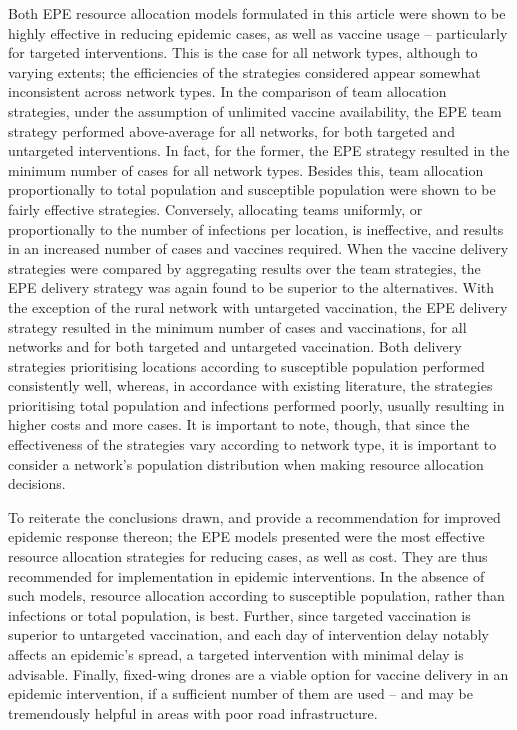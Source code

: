 \documentclass[10pt,letterpaper]{article}
\begin{document}
Both EPE resource allocation models formulated in this article were shown to be highly effective in reducing epidemic cases, as well as vaccine usage -- particularly for targeted interventions. This is the case for all network types, although to varying extents; the efficiencies of the strategies considered appear somewhat inconsistent across network types.
In the comparison of team allocation strategies, under the assumption of unlimited vaccine availability, the EPE team strategy performed above-average for all networks, for both targeted and untargeted interventions. In fact, for the former, the EPE strategy resulted in the minimum number of cases for all network types. Besides this, team allocation proportionally to total population and susceptible population were shown to be fairly effective strategies. Conversely, allocating teams uniformly, or proportionally to the number of infections per location, is ineffective, and results in an increased number of cases and vaccines required.
When the vaccine delivery strategies were compared by aggregating results over the team strategies, the EPE delivery strategy was again found to be superior to the alternatives. With the exception of the rural network with untargeted vaccination, the EPE delivery strategy resulted in the minimum number of cases and vaccinations, for all networks and for both targeted and untargeted vaccination. Both delivery strategies prioritising locations according to susceptible population performed consistently well, whereas, in accordance with existing literature, the strategies prioritising total population and infections performed poorly, usually resulting in higher costs and more cases. 
It is important to note, though, that since the effectiveness of the strategies vary according to network type, it is important to consider a network's population distribution when making resource allocation decisions.

To reiterate the conclusions drawn, and provide a recommendation for improved epidemic response thereon; the EPE models presented were the most effective resource allocation strategies for reducing cases, as well as cost. They are thus recommended for implementation in epidemic interventions. In the absence of such models, resource allocation according to susceptible population, rather than infections or total population, is best. Further, since targeted vaccination is superior to untargeted vaccination, and each day of intervention delay notably affects an epidemic's spread, a targeted intervention with minimal delay is advisable. Finally, fixed-wing drones are a viable option for vaccine delivery in an epidemic intervention, if a sufficient number of them are used -- and may be tremendously helpful in areas with poor road infrastructure.
\end{document}
